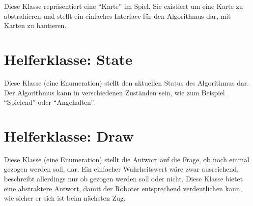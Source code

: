         Diese Klasse repräsentiert eine ``Karte'' im Spiel.
        Sie existiert um eine Karte zu abstrahieren und stellt ein einfaches
        Interface für den Algorithmus dar, mit Karten zu hantieren.

    \section{Helferklasse: State}

        Diese Klasse (eine Enumeration) stellt den aktuellen Status des
        Algorithmus dar.
        Der Algorithmus kann in verschiedenen Zuständen sein, wie zum Beispiel
        ``Spielend'' oder ``Angehalten''.

    \section{Helferklasse: Draw}

        Diese Klasse (eine Enumeration) stellt die Antwort auf die Frage, ob
        noch einmal gezogen werden soll, dar.
        Ein einfacher Wahrheitswert wäre zwar ausreichend, beschreibt allerdings
        nur ob gezogen werden soll oder nicht.
        Diese Klasse bietet eine abstraktere Antwort, damit der Roboter
        entsprechend verdeutlichen kann, wie sicher er sich ist beim nächsten
        Zug.

